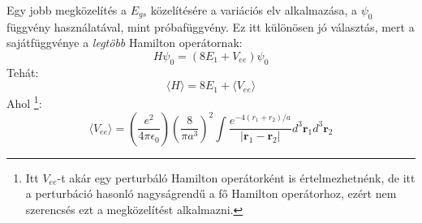 \documentclass[../main.tex]{subfiles}
\begin{document}
Egy jobb megközelítés a $E_{gs}$ közelítésére a variációs elv alkalmazása, a $\psi_0$ függvény használatával, mint próbafüggvény. Ez itt különösen jó választás, mert a sajátfüggvénye a \textit{legtöbb}
Hamilton operátornak:
\begin{equation}
    H \psi_0 = (8E_1 + V_{ee}) \psi_0
\end{equation}
Tehát:
\begin{equation}
    \langle H \rangle = 8 E_1 + \langle V_{ee} \rangle
\end{equation}
Ahol
\footnote{Itt $V_{ee}$-t akár egy perturbáló Hamilton operátorként is értelmezhetnénk, de itt a perturbáció hasonló nagyságrendű a fő Hamilton operátorhoz, ezért nem szerencsés ezt a megközelítést alkalmazni.}:
\begin{equation}
    \langle V_{ee} \rangle = \left(\frac{e^2}{4 \pi \epsilon_0}\right) \left(\frac{8}{\pi a^3}\right)^2 \int \frac{e^{-4(r_1 + r_2)/a}}{|\mathbf{r}_1 - \mathbf{r}_2|} d^3\mathbf{r}_1 d^3\mathbf{r}_2
\end{equation}
\end{document}
